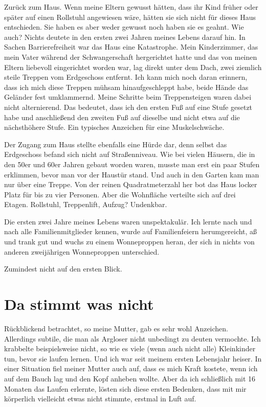 \documentclass[fontsize=14pt,a4paper,headinclude,DIV=calc,automark]{scrbook}
\begin{document}
Zurück zum Haus. Wenn meine Eltern gewusst hätten, dass ihr Kind früher oder später auf einen Rollstuhl angewiesen wäre, hätten sie sich nicht für dieses Haus entschieden. Sie haben es aber weder gewusst noch haben sie es geahnt. Wie auch? Nichts deutete in den ersten zwei Jahren meines Lebens darauf hin. In Sachen Barrierefreiheit war das Haus eine Katastrophe. Mein Kinderzimmer, das mein Vater während der Schwangerschaft hergerichtet hatte und das von meinen Eltern liebevoll eingerichtet worden war, lag direkt unter dem Dach, zwei ziemlich steile Treppen vom Erdgeschoss entfernt. Ich kann mich noch daran erinnern, dass ich mich diese Treppen mühsam hinaufgeschleppt habe, beide Hände das Geländer fest umklammernd. Meine Schritte beim Treppensteigen waren dabei nicht alternierend. Das bedeutet, dass ich den ersten Fuß auf eine Stufe gesetzt habe und anschließend den zweiten Fuß auf dieselbe und nicht etwa auf die nächsthöhere Stufe. Ein typisches Anzeichen für eine Muskelschwäche.

Der Zugang zum Haus stellte ebenfalls eine Hürde dar, denn selbst das Erdgeschoss befand sich nicht auf Straßenniveau. Wie bei vielen Häusern, die in den 50er und 60er Jahren gebaut worden waren, musste man erst ein paar Stufen erklimmen, bevor man vor der Haustür stand. Und auch in den Garten kam man nur über eine Treppe. Von der reinen Quadratmeterzahl her bot das Haus locker Platz für bis zu vier Personen. Aber die Wohnfläche verteilte sich auf drei Etagen. Rollstuhl, Treppenlift, Aufzug? Undenkbar.

Die ersten zwei Jahre meines Lebens waren unspektakulär. Ich lernte nach und nach alle Familienmitglieder kennen, wurde auf Familienfeiern herumgereicht, aß und trank gut und wuchs zu einem Wonneproppen heran, der sich in nichts von anderen zweijährigen Wonneproppen unterschied.

\vspace{0.5\baselineskip}

\noindent Zumindest nicht auf den ersten Blick.

\section{Da stimmt was nicht}
Rückblickend betrachtet, so meine Mutter, gab es sehr wohl Anzeichen. Allerdings subtile, die man als Argloser nicht unbedingt zu deuten vermochte. Ich krabbelte beispielsweise nicht, so wie es viele (wenn auch nicht alle) Kleinkinder tun, bevor sie laufen lernen. Und ich war seit meinem ersten Lebensjahr heiser. In einer Situation fiel meiner Mutter auch auf, dass es mich Kraft kostete, wenn ich auf dem Bauch lag und den Kopf anheben wollte. Aber da ich schließlich mit 16 Monaten das Laufen erlernte, lösten sich diese ersten Bedenken, dass mit mir körperlich vielleicht etwas nicht stimmte, erstmal in Luft auf.
\end{document}
